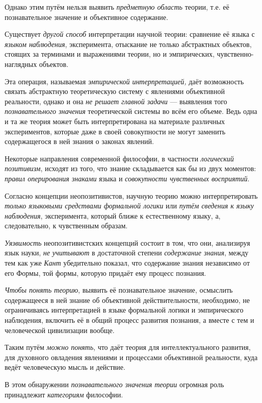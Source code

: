 \documentclass[a4paper,14pt,russian]{extreport}
\begin{document}
Однако этим путём нельзя выявить \emph{предметную область} теории, т.е. её познавательное значение и объективное содержание.

Существует \emph{другой способ} интерпретации научной теории: сравнение её языка с \emph{языком наблюдения}, эксперимента, отыскание не только абстрактных объектов, стоящих за терминами и выражениями теории, но и эмпирических, чувственно-наглядных объектов.

Эта операция, называемая \emph{эмпирической интерпретацией,} даёт возможность связать абстрактную теоретическую систему с явлениями объективной реальности, однако и она \emph{не решает главной задачи} --- выявления того \emph{познавательного значения} теоретической системы во всём его объеме. Ведь одна и та же теория может быть интерпретирована на материале различных экспериментов, которые даже в своей совокупности не могут заменить содержащегося в ней знания о законах явлений.

Некоторые направления современной философии, в частности \emph{логический позитивизм}, исходят из того, что знание складывается как бы из двух моментов: \emph{правил оперирования знаками} языка и \emph{совокупности чувственных восприятий}.

Согласно концепции неопозитивистов, научную теорию можно интерпретировать \emph{только языковыми средствами формальной логики} или \emph{путём сведения к языку наблюдения}, эксперимента, который ближе к естественному языку, а, следовательно, к чувственным образам.

\emph{Уязвимость} неопозитивистских концепций состоит в том, что они, анализируя язык науки, \emph{не учитывают} в достаточной степени \emph{содержание знания}, между тем как уже \emph{Кант} убедительно показал, что содержание знания независимо от его Формы, той формы, которую придаёт ему процесс познания.

\emph{Чтобы понять теорию}, выявить её познавательное значение, осмыслить содержащееся в ней знание об объективной действительности, необходимо, не ограничиваясь интерпретацией в языке формальной логики и эмпирического наблюдения, включить её в общий процесс развития познания, а вместе с тем и человеческой цивилизации вообще.

Таким путём \emph{можно понять}, что даёт теория для интеллектуального развития, для духовного овладения явлениями и процессами объективной реальности, куда ведёт человеческую мысль и действие.

В этом обнаружении \emph{познавательного значения теории} огромная роль принадлежит \emph{категориям} философии.
\end{document}
